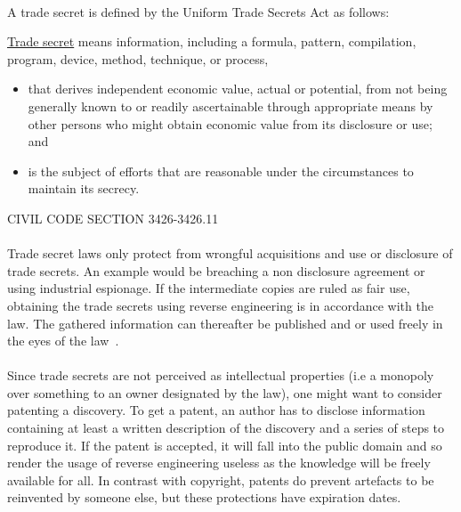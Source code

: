 \paragraph{}
A trade secret is defined by the Uniform Trade Secrets Act as follows:
\begin{framed}
	\begin{definition}
		\underline{Trade secret} means information, including a formula, pattern, compilation, program, device, method, technique, or process, 
		\begin{itemize}
			\item that derives independent economic value, actual or potential, from not being generally known to or readily ascertainable through appropriate means by other persons who might obtain economic value from its disclosure or use; and
			\item is the subject of efforts that are reasonable under the circumstances to maintain its secrecy.
		\end{itemize}
		\begin{flushright}
			\hfill{}{CIVIL CODE SECTION 3426-3426.11~\cite{trade_secret_law}}
		\end{flushright}
	\end{definition}
\end{framed}
\paragraph{}
Trade secret laws only protect from wrongful acquisitions and use or disclosure of trade secrets. An example would be breaching a non disclosure agreement or using industrial espionage. If the intermediate copies are ruled as fair use, obtaining the trade secrets using reverse engineering is in accordance with the law. The gathered information can thereafter be published and or used freely in the eyes of the law~\cite{samuelson1990reverse, samuelson2002law, graham1999legal}.

\paragraph{}
Since trade secrets are not perceived as intellectual properties (i.e a monopoly over something to an owner designated by the law), one might want to consider patenting a discovery. To get a patent, an author has to disclose information containing at least a written description of the discovery and a series of steps to reproduce it. If the patent is accepted, it will fall into the public domain and so render the usage of reverse engineering useless as the knowledge will be freely available for all. In contrast with copyright, patents do prevent artefacts to be reinvented by someone else, but these protections have expiration dates.

